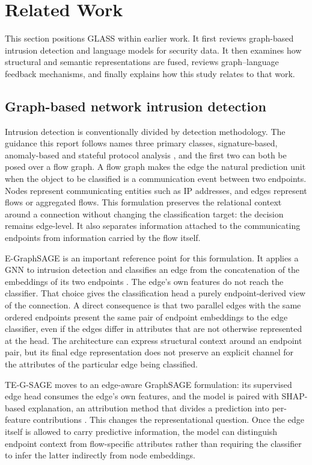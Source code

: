 \section{Related Work}
\label{sec:related}

This section positions GLASS within earlier work. It first reviews graph-based intrusion detection and language models for security data. It then examines how structural and semantic representations are fused, reviews graph--language feedback mechanisms, and finally explains how this study relates to that work.

\subsection{Graph-based network intrusion detection}

Intrusion detection is conventionally divided by detection methodology. The guidance this
report follows names three primary classes, signature-based, anomaly-based and stateful
protocol analysis \citep{scarfone2007idps}, and the first two can both be posed over a flow
graph. A flow
graph makes the edge the natural prediction unit when the object to be classified is a
communication event between two endpoints. Nodes represent communicating entities such as
IP addresses, and edges represent flows or aggregated flows. This formulation preserves the
relational context around a connection without changing the classification target: the
decision remains edge-level. It also separates information attached to the communicating
endpoints from information carried by the flow itself.

E-GraphSAGE is an important reference point for this formulation. It applies a GNN to
intrusion detection and classifies an edge from the concatenation of the embeddings of its
two endpoints \citep{lo2022egraphsage}. The edge's own features do not reach the
classifier. That choice gives the classification head a purely endpoint-derived view of the
connection. A direct consequence is that two parallel edges with the same ordered endpoints
present the same pair of endpoint embeddings to the edge classifier, even if the edges
differ in attributes that are not otherwise represented at the head. The architecture can
express structural context around an endpoint pair, but its final edge representation does
not preserve an explicit channel for the attributes of the particular edge being classified.

TE-G-SAGE moves to an edge-aware GraphSAGE formulation: its supervised edge head consumes
the edge's own features, and the model is paired with SHAP-based explanation, an attribution
method that divides a prediction into per-feature contributions \citep{tegsage2025}. This changes the representational question. Once the edge itself is
allowed to carry predictive information, the model can distinguish endpoint context from
flow-specific attributes rather than requiring the classifier to infer the latter
indirectly from node embeddings.

